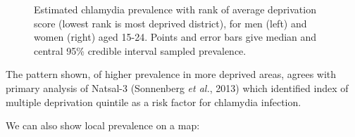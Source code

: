 \documentclass{article}
\begin{document}
    \begin{figure}
        \begin{center}\end{center}
        \caption{Estimated chlamydia prevalence with rank of average deprivation score (lowest rank is most deprived district), for men (left) and women (right) aged 15-24. Points and error bars give median and central 95\% credible interval sampled prevalence.}
        \label{}
    \end{figure}
    
    The pattern shown, of higher prevalence in more deprived areas, agrees
with primary analysis of Natsal-3 (Sonnenberg \emph{et al.}, 2013) which
identified index of multiple deprivation quintile as a risk factor for
chlamydia infection.

We can also show local prevalence on a map:
\end{document}
